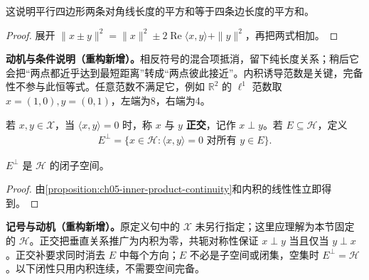 \documentclass[../../main.tex]{subfiles}
\begin{document}
这说明平行四边形两条对角线长度的平方和等于四条边长度的平方和。
\begin{proof}
展开 $\|x\pm y\|^2=\|x\|^2\pm2\operatorname{Re}\langle x,y\rangle+\|y\|^2$，再把两式相加。
\end{proof}
\begin{remark}
\textbf{动机与条件说明（重构新增）。}相反符号的混合项抵消，留下纯长度关系；稍后它会把“两点都近乎达到最短距离”转成“两点彼此接近”。内积诱导范数是关键，完备性不参与此恒等式。任意范数不满足它，例如 $\mathbb R^2$ 的 $\ell^1$ 范数取 $x=(1,0),y=(0,1)$，左端为8，右端为4。
\end{remark}
\begin{definition}[正交与正交补]\label{definition:ch05-orthogonality}
若 $x,y\in\mathscr X$，当 $\langle x,y\rangle=0$ 时，称 $x$ 与 $y$ \textbf{正交}，记作 $x\perp y$。若 $E\subseteq\mathscr H$，定义
\begin{align*}
E^\perp=\{x\in\mathscr H:\langle x,y\rangle=0\text{ 对所有 }y\in E\}.
\end{align*}
\end{definition}
\begin{proposition}\label{proposition:ch05-orthogonal-complement-closed}
$E^\perp$ 是 $\mathscr H$ 的闭子空间。
\end{proposition}
\begin{proof}
由\cref{proposition:ch05-inner-product-continuity}和内积的线性性立即得到。
\end{proof}
\begin{remark}
\textbf{记号与动机（重构新增）。}原定义句中的 $\mathscr X$ 未另行指定；这里应理解为本节固定的 $\mathscr H$。正交把垂直关系推广为内积为零，共轭对称性保证 $x\perp y$ 当且仅当 $y\perp x$。正交补要求同时消去 $E$ 中每个方向；$E$ 不必是子空间或闭集，空集时 $E^\perp=\mathscr H$。以下闭性只用内积连续，不需要空间完备。
\end{remark}
\end{document}
